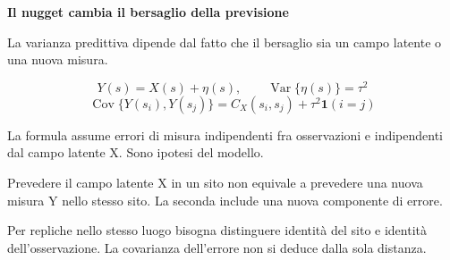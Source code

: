 \documentclass[12pt,aspectratio=1610]{beamer}
\newcommand{\PBody}[1]{\par{\fontsize{11.3}{14.8}\selectfont #1\par}}
\newcommand{\PSmall}[1]{\par{\fontsize{9.8}{13.1}\selectfont #1\par}}
\newcommand{\PInfo}[1]{%
\begin{tcolorbox}[enhanced,arc=1.6mm,boxrule=.55pt,colback=GeoTint,
 colframe=Rule!80!Classical,left=2.3mm,right=2.3mm,top=2mm,bottom=2mm,
 before skip=1mm,after skip=1mm]
\PSmall{#1}\end{tcolorbox}}
\begin{document}
\begin{frame}[plain]\hypertarget{slide79}{}
\begin{lrbox}{\TitleBox}
\begin{minipage}[t]{17.7cm}\raggedright\color{Ink}\fontsize{11.3}{14.8}\selectfont
\color{Navy}\bfseries\fontsize{20.6}{24.5}\selectfont Il nugget cambia il bersaglio della previsione
\end{minipage}\end{lrbox}

\begin{lrbox}{\RecallBox}
\begin{minipage}[t]{14.3cm}\raggedright\color{Ink}\fontsize{11.3}{14.8}\selectfont
\fontsize{10.3}{13.8}\selectfont La varianza predittiva dipende dal fatto che il bersaglio sia un campo latente o una nuova misura.
\end{minipage}\end{lrbox}

\begin{lrbox}{\PilotLeftBox}
\begin{minipage}[t]{10.05cm}\raggedright\color{Ink}\fontsize{11.3}{14.8}\selectfont
\[Y(s)=X(s)+\eta(s),\qquad \operatorname{Var}\{\eta(s)\}=\tau^2\]
\[\operatorname{Cov}\{Y(s_i),Y(s_j)\}=C_X(s_i,s_j)+\tau^2\mathbf1(i=j)\]
\PInfo{La formula assume errori di misura indipendenti fra osservazioni e indipendenti dal campo latente X. Sono ipotesi del modello.}

\end{minipage}\end{lrbox}

\begin{lrbox}{\PilotRightBox}
\begin{minipage}[t]{7.55cm}\raggedright\color{Ink}\fontsize{11.3}{14.8}\selectfont
\PBody{Prevedere il campo latente X in un sito non equivale a prevedere una nuova misura Y nello stesso sito. La seconda include una nuova componente di errore.}
\vspace{2.5mm}
\PBody{Per repliche nello stesso luogo bisogna distinguere identità del sito e identità dell’osservazione. La covarianza dell’errore non si deduce dalla sola distanza.}
\vspace{2.5mm}


\end{minipage}
\end{lrbox}
\end{frame}
\end{document}
